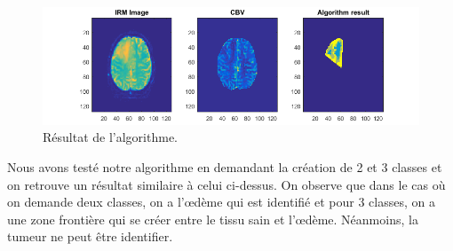 \begin{figure}[H]
\centering
    \includegraphics[scale=0.8,angle=0]{Images/Patient2Result.png}
    \caption{Résultat de l'algorithme.}
    \label{fig:patient4IRMResult}
\end{figure}

Nous avons testé notre algorithme en demandant la création de 2 et 3 classes et on retrouve un résultat similaire à celui ci-dessus. On observe que dans le cas où on demande deux classes, on a l'œdème qui est identifié et pour 3 classes, on a une zone frontière qui se créer entre le tissu sain et l'œdème. Néanmoins, la tumeur ne peut être identifier.

